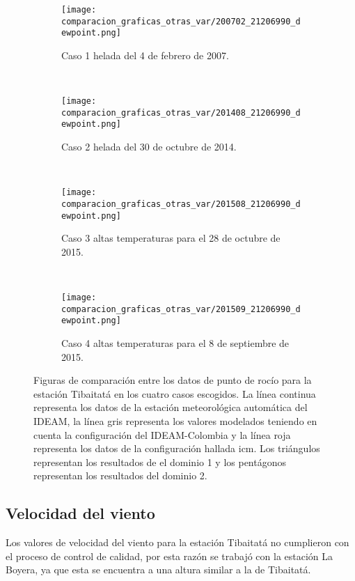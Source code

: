 \begin{figure}[H]
    
\begin{subfigure}[normla]{0.4\textwidth}
\caption{Caso 1 helada del 4 de febrero de 2007.}
\label{caso1_tiba_wrf_dp}
\texttt{[image: comparacion\_graficas\_otras\_var/200702\_21206990\_dewpoint.png]}
\end{subfigure}
~
\begin{subfigure}[normla]{0.4\textwidth}
\caption{Caso 2 helada del 30 de octubre de 2014.}
\label{caso2_tiba_wrf_dp}
\texttt{[image: comparacion\_graficas\_otras\_var/201408\_21206990\_dewpoint.png]}
\end{subfigure}
~
\centering
\begin{subfigure}[normla]{0.4\textwidth}
\caption{Caso 3 altas temperaturas para el 28 de octubre de 2015.}
\label{caso3_tiba_wrf_dp}
\texttt{[image: comparacion\_graficas\_otras\_var/201508\_21206990\_dewpoint.png]}
\end{subfigure}
~
\centering
\begin{subfigure}[normla]{0.4\textwidth}
\caption{Caso 4 altas temperaturas para el 8 de septiembre de 2015.}
\label{caso4_tiba_wrf_dp}
\texttt{[image: comparacion\_graficas\_otras\_var/201509\_21206990\_dewpoint.png]}
\end{subfigure}

    \caption{Figuras de comparación entre los datos de punto de rocío para la estación Tibaitatá en los cuatro casos escogidos. La línea continua representa los datos de la estación meteorológica automática del IDEAM, la línea gris representa los valores modelados teniendo en cuenta la configuración del IDEAM-Colombia y la línea roja representa los datos de la configuración hallada icm. Los triángulos representan los resultados de el dominio 1 y los pentágonos representan los resultados del dominio 2.}
    \label{fig:wrf_dp_tibaitata}
\end{figure}


\subsection{Velocidad del viento}

Los valores de velocidad del viento para la estación Tibaitatá no cumplieron con el proceso de control de calidad, por esta razón se trabajó con la estación La Boyera, ya que esta se encuentra a una altura similar a la de Tibaitatá.

